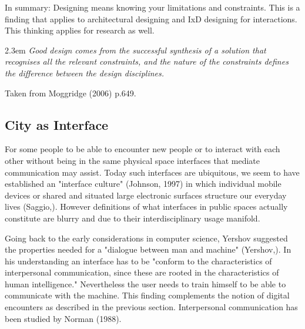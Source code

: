 In summary: Designing means knowing your limitations and constraints. This is a finding that applies to architectural designing and IxD designing for interactions. 
This thinking applies for research as well.


\begin{singlespace}
	\leftskip2.3em
		\rightskip\leftskip
\textit{\small Good design comes from the successful synthesis of a solution that recognises all the relevant constraints, and the nature of the constraints defines the difference between the design disciplines.} 

\small Taken from Moggridge (2006) p.649.
\end{singlespace}


\subsection {City as Interface}

For some people to be able to encounter new people or to interact with each other without being in the same physical space interfaces that mediate communication may assist.
Today such interfaces are ubiquitous, we seem to have established an "interface culture" (Johnson, 1997) 
in which individual mobile devices or shared and situated large electronic surfaces structure our everyday lives (Saggio,).
However definitions of what interfaces in public spaces actually constitute are blurry and due to their interdisciplinary usage manifold.  

Going back to the early considerations in computer science, Yershov suggested the properties needed for a "dialogue between man and machine" (Yershov,). In his understanding an interface has to be "conform to the characteristics of interpersonal communication, since these are rooted in the characteristics of human intelligence."
Nevertheless the user needs to train himself to be able to communicate with the machine. 
This finding complements the notion of digital encounters as described in the previous section.
Interpersonal communication has been studied by Norman (1988).

